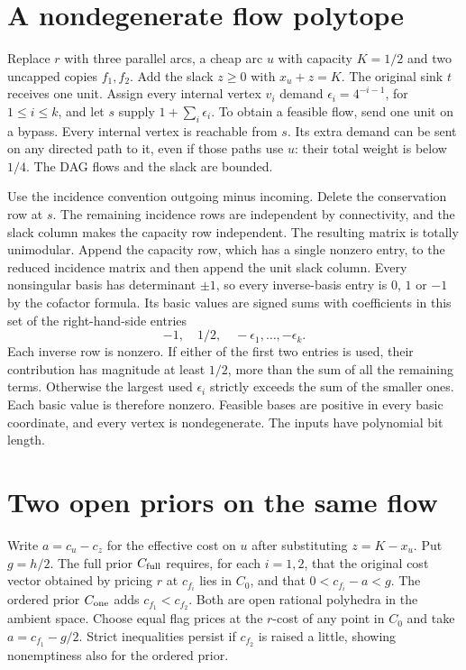 \documentclass[11pt,a4paper]{amsart}
\begin{document}
\section{A nondegenerate flow polytope}
Replace $r$ with three parallel arcs, a cheap arc $u$ with capacity $K=1/2$ and two uncapped copies $f_1,f_2$. Add the slack $z\geq0$ with $x_u+z=K$. The original sink $t$ receives one unit. Assign every internal vertex $v_i$ demand $\epsilon_i=4^{-i-1}$, for $1\leq i\leq k$, and let $s$ supply $1+\sum_i\epsilon_i$. To obtain a feasible flow, send one unit on a bypass. Every internal vertex is reachable from $s$. Its extra demand can be sent on any directed path to it, even if those paths use $u$: their total weight is below $1/4$. The DAG flows and the slack are bounded.

Use the incidence convention outgoing minus incoming. Delete the conservation row at $s$. The remaining incidence rows are independent by connectivity, and the slack column makes the capacity row independent. The resulting matrix is totally unimodular. Append the capacity row, which has a single nonzero entry, to the reduced incidence matrix and then append the unit slack column. Every nonsingular basis has determinant $\pm1$, so every inverse-basis entry is $0$, $1$ or $-1$ by the cofactor formula. Its basic values are signed sums with coefficients in this set of the right-hand-side entries
\[
              -1,\quad 1/2,\quad -\epsilon_1,\ldots,-\epsilon_k .
\]
Each inverse row is nonzero. If either of the first two entries is used, their contribution has magnitude at least $1/2$, more than the sum of all the remaining terms. Otherwise the largest used $\epsilon_i$ strictly exceeds the sum of the smaller ones. Each basic value is therefore nonzero. Feasible bases are positive in every basic coordinate, and every vertex is nondegenerate. The inputs have polynomial bit length.

\section{Two open priors on the same flow}
Write $a=c_u-c_z$ for the effective cost on $u$ after substituting $z=K-x_u$. Put $g=h/2$. The full prior $C_{\rm full}$ requires, for each $i=1,2$, that the original cost vector obtained by pricing $r$ at $c_{f_i}$ lies in $C_0$, and that $0<c_{f_i}-a<g$. The ordered prior $C_{\rm one}$ adds $c_{f_1}<c_{f_2}$. Both are open rational polyhedra in the ambient space. Choose equal flag prices at the $r$-cost of any point in $C_0$ and take $a=c_{f_1}-g/2$. Strict inequalities persist if $c_{f_2}$ is raised a little, showing nonemptiness also for the ordered prior.
\end{document}

